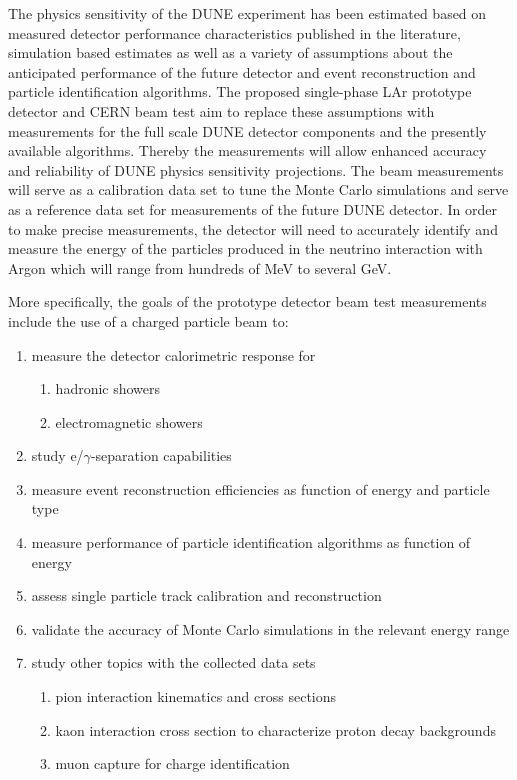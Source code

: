 The physics sensitivity of the DUNE experiment has been estimated
based on measured detector performance characteristics published in
the literature, simulation based estimates as well as a variety of
assumptions about the anticipated performance of the future detector
and event reconstruction and particle identification algorithms.  The
proposed single-phase LAr prototype detector and CERN beam test aim to
replace these assumptions with measurements for the full scale DUNE
detector components and the presently available algorithms. Thereby
the measurements will allow enhanced accuracy and reliability of DUNE
physics sensitivity projections.  The beam measurements will serve as
a calibration data set to tune the Monte Carlo simulations and serve
as a reference data set for measurements of the future DUNE detector.
In order to make precise measurements, the detector will need to
accurately identify and measure the energy of the particles produced
in the neutrino interaction with Argon which will range from hundreds
of MeV to several GeV.

More specifically, the goals of the prototype detector beam test measurements include
the use of a charged particle beam to:
\begin{enumerate}
\item measure the detector calorimetric response for
\begin{enumerate}
	\item hadronic showers
	\item electromagnetic showers
\end{enumerate}
\item study e/$\gamma$-separation capabilities
\item measure event reconstruction efficiencies as function of energy and particle type 
\item measure performance of particle identification algorithms as function of energy 
\item assess single particle track calibration and reconstruction
\item validate the accuracy of Monte Carlo simulations in the relevant energy range

\item study other topics with the collected data sets
 \begin{enumerate}
    \item pion interaction kinematics and cross sections
    \item kaon interaction cross section to characterize proton decay backgrounds 
    \item muon capture for charge identification
 \end{enumerate}
\end{enumerate}

